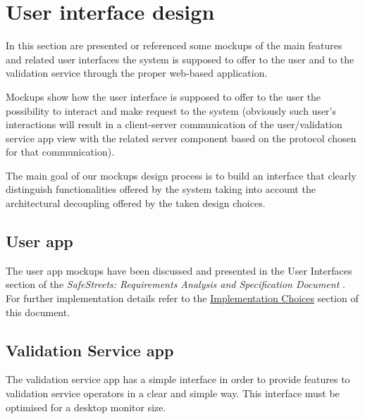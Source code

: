 \setlength{\parindent}{4ex}
\setlength{\parskip}{1ex}

\section{User interface design}
In this section are presented or referenced some mockups of the main features and related user interfaces the system is supposed to offer to the user and to the validation service through the proper web-based application.

Mockups show how the user interface is supposed to offer to the user the possibility to interact and make request to the system (obviously such user's interactions will result in a client-server communication of the user/validation service app view with the related server component based on the protocol chosen for that communication).

The main goal of our mockups design process is to build an interface that clearly distinguish functionalities offered by the system taking into account the architectural decoupling offered by the taken design choices.

\subsection{User app}
The user app mockups have been discussed and presented in the User Interfaces section of the \emph{SafeStreets: Requirements Analysis and Specification Document} \cite{RASD}. For further implementation details refer to the \hyperref[sec:implementationChoices]{Implementation Choices} section of this document.

\subsection{Validation Service app}
The validation service app has a simple interface in order to provide features to validation service operators in a clear and simple way. This interface must be optimised for a desktop monitor size.

\clearpage
